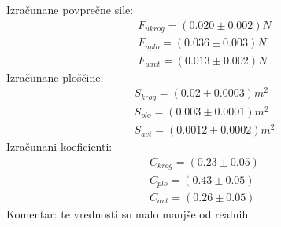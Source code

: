 \documentclass[11pt]{article}
\begin{document}
    Izračunane povprečne sile:
    \begin{align*}
        F_{ukrog} = (0.020 \pm 0.002) N \\
        F_{uplo} = (0.036 \pm 0.003) N \\
        F_{uavt} = (0.013 \pm 0.002) N
    \end{align*}
    Izračunane ploščine:
    \begin{align*}
        S_{krog} = (0.02 \pm 0.0003) m^2 \\
        S_{plo} = (0.003 \pm 0.0001) m^2  \\
        S_{avt} = (0.0012 \pm 0.0002) m^2
    \end{align*}
    Izračunani koeficienti:
    \begin{align*}
        C_{krog} = (0.23 \pm 0.05)  \\
        C_{plo} = (0.43 \pm 0.05)   \\
        C_{avt} = (0.26 \pm 0.05)
    \end{align*}
    Komentar: te vrednosti so malo manjše od realnih.
\end{document}

